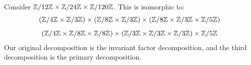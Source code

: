 \begin{xmp}[source=Primary Source Material]
    Consider $ \mathbb{Z}/12\mathbb{Z} \times \mathbb{Z}/24\mathbb{Z} \times \mathbb{Z}/120\mathbb{Z} $.
    This is isomorphic to:
    \begin{gather*}
        (\bb{Z}/4\bb{Z} \times \bb{Z}/3\bb{Z}) \times
        (\bb{Z}/8\bb{Z} \times \bb{Z}/3\bb{Z}) \times
        (\bb{Z}/8\bb{Z} \times \bb{Z}/3\bb{Z} \times \bb{Z}/5\bb{Z}) \vsp
        (\bb{Z}/4\bb{Z} \times \bb{Z}/8\bb{Z} \times \bb{Z}/8\bb{Z}) \times
        (\bb{Z}/3\bb{Z} \times \bb{Z}/3\bb{Z} \times \bb{Z}/3\bb{Z}) \times
        \bb{Z}/5\bb{Z}
    \end{gather*}
    Our original decomposition is the invariant factor decomposition, and the
    third decomposition is the primary decomposition.
\end{xmp}
